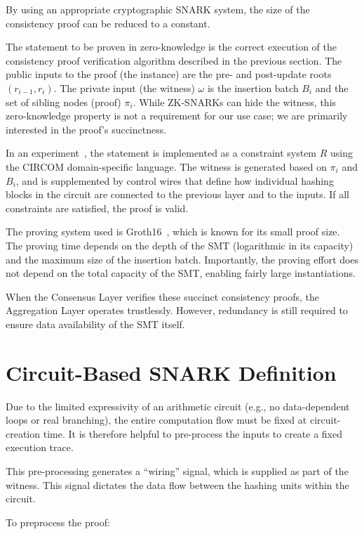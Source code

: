 \documentclass[twocolumn]{article}
\begin{document}
By using an appropriate cryptographic SNARK system, the size of the consistency proof can be reduced to a constant.

The statement to be proven in zero-knowledge is the correct execution of the consistency proof verification algorithm described in the previous section. The public inputs to the proof (the instance) are the pre- and post-update roots $(r_{i-1}, r_i)$. The private input (the witness) $\omega$ is the insertion batch $B_i$ and the set of sibling nodes (proof) $\pi_i$. While ZK-SNARKs can hide the witness, this zero-knowledge property is not a requirement for our use case; we are primarily interested in the proof's succinctness.

In an experiment~\cite{snark}, the statement is implemented as a constraint system $R$ using the CIRCOM domain-specific language. The witness is generated based on $\pi_i$ and $B_i$, and is supplemented by control wires that define how individual hashing blocks in the circuit are connected to the previous layer and to the inputs. If all constraints are satisfied, the proof is valid.

The proving system used is Groth16~\cite{cryptoeprint:2016/260}, which is known for its small proof size. The proving time depends on the depth of the SMT (logarithmic in its capacity) and the maximum size of the insertion batch. Importantly, the proving effort does not depend on the total capacity of the SMT, enabling fairly large instantiations.

When the Consensus Layer verifies these succinct consistency proofs, the Aggregation Layer operates trustlessly. However, redundancy is still required to ensure data availability of the SMT itself.


\section{Circuit-Based SNARK Definition}

Due to the limited expressivity of an arithmetic circuit (e.g., no data-dependent loops or real branching), the entire computation flow must be fixed at circuit-creation time. It is therefore helpful to pre-process the inputs to create a fixed execution trace.

This pre-processing generates a ``wiring'' signal, which is supplied as part of the witness. This signal dictates the data flow between the hashing units within the circuit.

To preprocess the proof:
\end{document}
